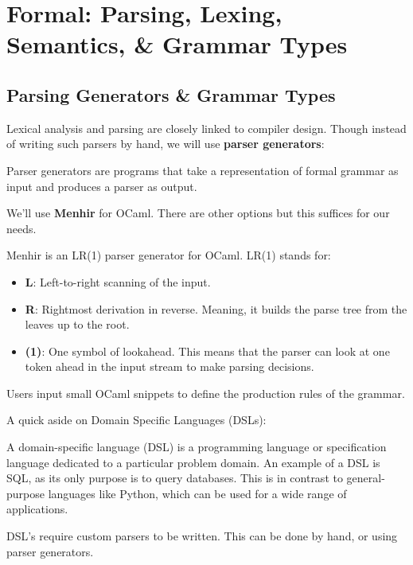 \section{Formal: Parsing, Lexing, Semantics, \& Grammar Types}
\subsection{Parsing Generators \& Grammar Types}


Lexical analysis and parsing are closely linked to 
compiler design. Though instead of writing such parsers by 
hand, we will use \textbf{parser generators}:

\begin{Def}

    \label{def:parser-generator}
    Parser generators are programs that take a representation of formal grammar as input and produces a parser as output.
\end{Def}

\noindent
We'll use \textbf{Menhir} for OCaml. There are other options but this suffices for our needs.
\begin{Def}[Menhir]

    Menhir is an LR(1) parser generator for OCaml. LR(1) stands for:
    \begin{itemize}
        \item \textbf{L}: Left-to-right scanning of the input.
        \item \textbf{R}: Rightmost derivation in reverse. Meaning, it builds the parse tree from the leaves up to the root.
        \item \textbf{(1)}: One symbol of lookahead. This means that the parser can look at one token ahead in the input stream to make parsing decisions.
    \end{itemize}
    \noindent
    Users input small OCaml snippets to define the production rules of the grammar.
\end{Def}

\newpage 

\noindent
A quick aside on Domain Specific Languages (DSLs):

\begin{Def}

    A domain-specific language (DSL) is a programming language or specification language dedicated to a particular problem domain.
    An example of a DSL is SQL, as its only purpose is to query databases. This is in contrast to general-purpose languages like Python, which can be used for a wide range of applications.

    DSL's require custom parsers to be written. This can be done by hand, or using parser generators.
\end{Def}


